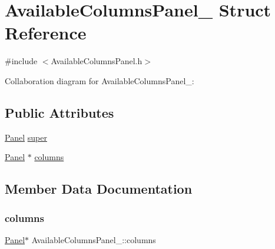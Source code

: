 \hypertarget{structAvailableColumnsPanel__}{}\section{Available\+Columns\+Panel\+\_\+ Struct Reference}
\label{structAvailableColumnsPanel__}


{\ttfamily \#include $<$Available\+Columns\+Panel.\+h$>$}



Collaboration diagram for Available\+Columns\+Panel\+\_\+\+:
\subsection*{Public Attributes}
\begin{DoxyCompactItemize}
\item 
\hyperlink{Panel_8h_a034d4c16521db412dc7a1e8536d16fae}{Panel} \hyperlink{structAvailableColumnsPanel___affc76375e479b2bae024b12f25ce2407}{super}
\item 
\hyperlink{Panel_8h_a034d4c16521db412dc7a1e8536d16fae}{Panel} $\ast$ \hyperlink{structAvailableColumnsPanel___a84c451556071b1f7d8a752be1c8388d8}{columns}
\end{DoxyCompactItemize}


\subsection{Member Data Documentation}
\mbox{\label{structAvailableColumnsPanel___a84c451556071b1f7d8a752be1c8388d8}} 
\subsubsection{\texorpdfstring{columns}{columns}}
{\footnotesize\ttfamily \hyperlink{Panel_8h_a034d4c16521db412dc7a1e8536d16fae}{Panel}$\ast$ Available\+Columns\+Panel\+\_\+\+::columns}

\mbox{\label{structAvailableColumnsPanel___affc76375e479b2bae024b12f25ce2407}} 
